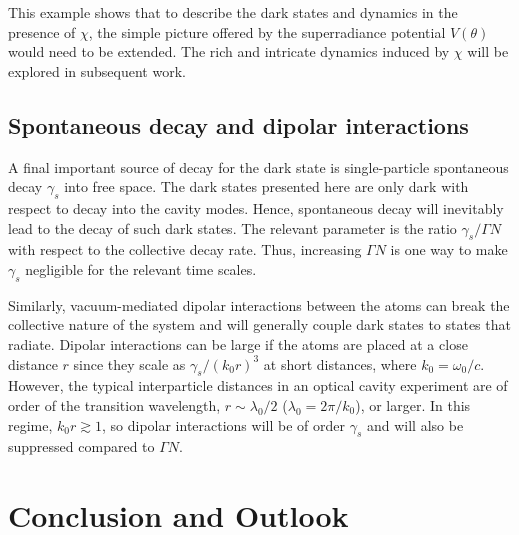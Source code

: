 \documentclass[aps,prx,superscriptaddress,twocolumn,notitlepage,nofootinbib,longbibliography]{revtex4-2}
\begin{document}
This example shows that to describe the dark states and dynamics in the presence of $\chi$, the simple picture offered by the superradiance potential $V(\theta)$ would need to be extended.
The rich and intricate dynamics induced by $\chi$ will be explored in subsequent work.







\subsection{Spontaneous decay and dipolar interactions\label{ssec:spont_decay}}

A final important source of decay for the dark state is single-particle spontaneous decay $\gamma_s$ into free space. The dark states presented here are only dark with respect to decay into the cavity modes. Hence, spontaneous decay will inevitably lead to the decay of such dark states.
The relevant parameter is the ratio $\gamma_s/\Gamma N$ with respect to the collective decay rate. Thus, increasing $\Gamma N$ is one way to make $\gamma_s$ negligible for the relevant time scales.

Similarly, vacuum-mediated dipolar interactions between the atoms can break the collective nature of the system and will generally couple dark states to states that radiate.
Dipolar interactions can be large if the atoms are placed at a close distance $r$ since they scale as $\gamma_s/(k_0r)^3$ at short distances, where $k_0=\omega_0/c$.
However, the typical interparticle distances in an optical cavity experiment are of order of the transition wavelength, $r\sim\lambda_0/2$ ($\lambda_0=2\pi/k_0$), or larger. In this regime, $k_0r \gtrsim 1$, so dipolar interactions will be of order $\gamma_s$ and will also be suppressed compared to $\Gamma N$.
















\section{Conclusion and Outlook\label{sec:conclusions}}
\end{document}
